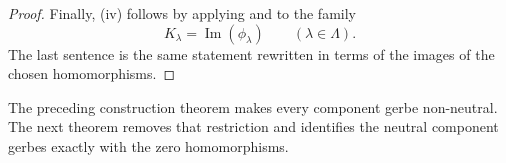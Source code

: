 \begin{proof}
Finally, \textup{(iv)} follows by applying
 and 
to the family
\[
K_\lambda=\operatorname{Im}(\phi_\lambda)
\qquad
(\lambda\in\Lambda).
\]
The last sentence is the same statement rewritten in terms of the images of the chosen homomorphisms.
\end{proof}

The preceding construction theorem makes every component gerbe non-neutral. The next theorem removes that restriction and identifies the neutral component gerbes exactly with the zero homomorphisms.
